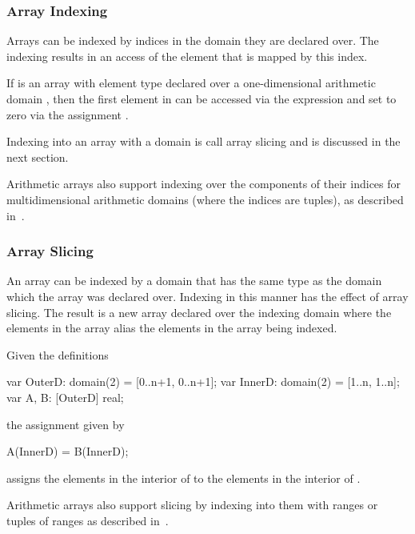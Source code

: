 \subsubsection{Array Indexing}
\label{Array_Indexing}

Arrays can be indexed by indices in the domain they are declared over.
The indexing results in an access of the element that is mapped by
this index.

\begin{example}
If  is an array with element type  declared over a
one-dimensional arithmetic domain \chpl{[1..n]}, then the first
element in  can be accessed via the expression  and
set to zero via the assignment .
\end{example}

Indexing into an array with a domain is call array slicing and is
discussed in the next section.

Arithmetic arrays also support indexing over the components of their
indices for multidimensional arithmetic domains (where the indices are
tuples), as described in~.

\subsubsection{Array Slicing}
\label{Array_Slicing}

An array can be indexed by a domain that has the same type as the
domain which the array was declared over.  Indexing in this manner has
the effect of array slicing.  The result is a new array declared over
the indexing domain where the elements in the array alias the elements
in the array being indexed.

\begin{example}
Given the definitions
\begin{chapel}
var OuterD: domain(2) = [0..n+1, 0..n+1];
var InnerD: domain(2) = [1..n, 1..n];
var A, B: [OuterD] real;
\end{chapel}
the assignment given by
\begin{chapel}
A(InnerD) = B(InnerD);
\end{chapel}
assigns the elements in the interior of  to the elements in
the interior of .
\end{example}

Arithmetic arrays also support slicing by indexing into them with
ranges or tuples of ranges as described
in~.

